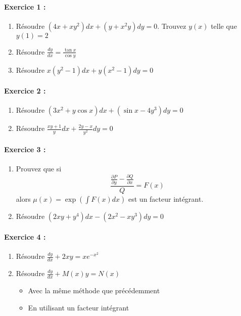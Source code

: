 \documentclass{article}
\begin{document}
\setcounter{tocdepth}{4}
\tableofcontents
\newpage

\paragraph{Exercice 1 : \\}
\begin{enumerate}
\item Résoudre $(4x+xy^2)dx+(y+x^2y)dy=0$. Trouvez $y(x)$ telle que $y(1)=2$
\item Résoudre $\frac{dy}{dx}=\frac{\tan x}{\cos y}$
\item Résoudre $x(y^2-1)dx+y(x^2-1)dy=0$
\end{enumerate}

\paragraph{Exercice 2 : \\}
\begin{enumerate}
\item Résoudre $(3x^2+y\cos x)dx + (\sin x-4y^3)dy=0$
\item Résoudre $\frac{xy+1}{y}dx+\frac{2y-x}{y^2}dy=0$
\end{enumerate}

\paragraph{Exercice 3 : \\}
\begin{enumerate}
\item Prouvez que si \[\frac{\frac{\partial P}{\partial y}-\frac{\partial Q}{\partial x}}{Q}=F(x)\]
alors $\mu(x)=\exp\left(\int F(x)dx\right)$ est un facteur intégrant.
\item Résoudre $(2xy+y^4)dx-(2x^2-xy^3)dy = 0$ 
\end{enumerate}

\paragraph{Exercice 4 : \\}
\begin{enumerate}
\item Résoudre $\frac{dy}{dx} + 2xy = xe^{-x^2}$
\item Résoudre $\frac{dy}{dx} + M(x)y = N(x)$
	\begin{itemize}
	\item Avec la même méthode que précédemment
	\item En utilisant un facteur intégrant
	\end{itemize}
\end{enumerate}
\end{document}
